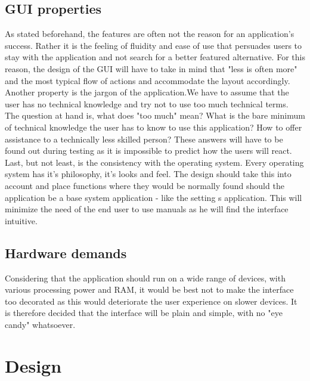 \documentclass[11pt]{article} %
\begin{document}
\subsection{GUI properties}
As stated beforehand, the features are often not the reason for an application's success. Rather it is the feeling of fluidity and ease of use that persuades users to stay with the application and not search for a better featured alternative. For this reason, the design of the GUI will have to take in mind that "less is often more" and the most typical flow of actions and accommodate the layout accordingly. Another property is the jargon of the application.We have to assume that the user has no technical knowledge and try not to use too much technical terms. The question at hand is, what does "too much" mean? What is the bare minimum of technical knowledge the user has to know to use this application? How to offer assistance to a technically less skilled person? These answers will have to be found out during testing as it is impossible to predict how the users will react. Last, but not least, is the consistency with the operating system. Every operating system has it's philosophy, it's looks and feel. The design should take this into account and place functions where they would be normally found should the application be a base system application - like the setting s application. This will minimize the need of the end user to use manuals as he will find the interface intuitive.

\subsection{Hardware demands}
Considering that the application should run on a wide range of devices, with various processing power and RAM, it would be best not to make the interface too decorated as this would deteriorate the user experience on slower devices. It is therefore decided that the interface will be plain and simple, with no "eye candy" whatsoever.

\section{Design}
\end{document}
